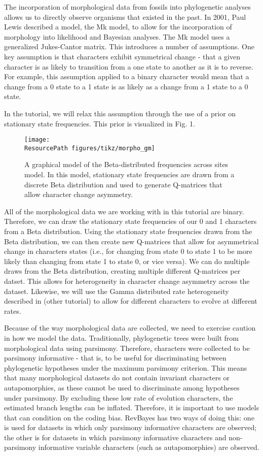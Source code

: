 The incorporation of morphological data from fossils into phylogenetic analyses allows us to directly observe organisms that existed in the past.
In 2001, Paul Lewis described a model, the Mk model, to allow for the incorporation of morphology into likelihood and Bayesian analyses.
The Mk model uses a generalized Jukes-Cantor matrix.
This introduces a number of assumptions. 
One key assumption is that characters exhibit symmetrical change - that a given character is as likely to transition from a one state to another as it is to reverse.
For example, this assumption applied to a binary character would mean that a change from a 0 state to a 1 state is as likely as a change from a 1 state to a 0 state. \par
In the tutorial, we will relax this assumption through the use of a prior on stationary state frequencies. 
This prior is visualized in Fig. 1. 
\begin{figure}[h!]
\centering
\texttt{[image: \\ResourcePath figures/tikz/morpho\_gm]}
\caption{\small A graphical model of the Beta-distributed frequencies across sites model. In this model, stationary state frequencies are drawn from a discrete Beta distribution and used to generate Q-matrices that allow character change asymmetry.}
\label{fig:morpho_gm}
\end{figure}
All of the morphological data we are working with in this tutorial are binary.  
Therefore, we can draw the stationary state frequencies of our 0 and 1 characters from a Beta distribution. 
Using the stationary state frequencies drawn from the Beta distribution, we can then create new Q-matrices that allow for asymmetrical change in characters states (i.e., for changing from state 0 to state 1 to be more likely than changing from state 1 to state 0, or vice versa). 
We can do multiple draws from the Beta distribution, creating multiple different Q-matrices per datset.
This allows for heterogeneity in character change asymmetry across the dataset. 
Likewise, we will use the Gamma distributed rate heterogeneity described in (other tutorial) to allow for different characters to evolve at different rates.\par

Because of the way morphological data are collected, we need to exercise caution in how we model the data. 
Traditionally, phylogenetic trees were built from morphological data using parsimony. 
Therefore, characters were collected to be parsimony informative - that is, to be useful for discriminating between phylogenetic hypotheses under the maximum parsimony criterion.
This means that many morphological datasets do not contain invariant characters or autapomorphies, as these cannot be used to discriminate among hypotheses under parsimony. 
By excluding these low rate of evolution characters, the estimated branch lengths can be inflated.
Therefore, it is important to use models that can condition on the coding bias. 
RevBayes has two ways of doing this: one is used for datasets in which only parsimony informative characters are observed; the other is for datasets in which parsimony informative characters and non-parsimony informative variable characters (such as autapomorphies) are observed. \par


